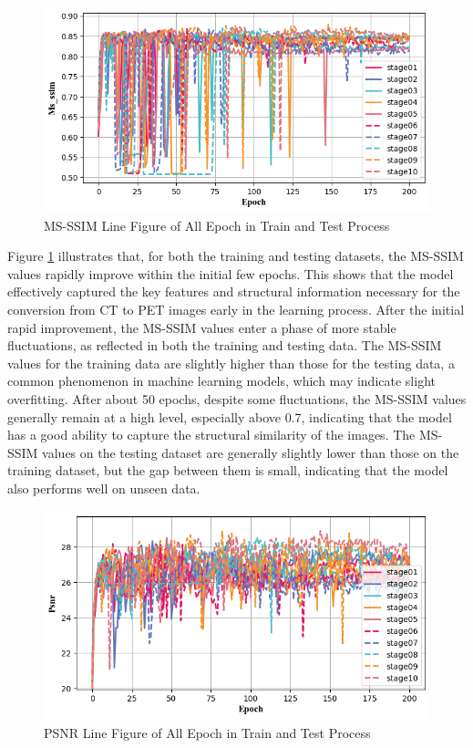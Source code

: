 \documentclass[twocolumn]{article}
\begin{document}
\begin{figure}[h]
	\centering
	\includegraphics[width=1.0\linewidth]{u-net/lung/csv_img_in_1_img_8_4/ms_ssim_comparison}
	\caption[msssim]{MS-SSIM Line Figure of All Epoch in Train and Test Process}
	\label{fig:msssim}
\end{figure}

Figure \ref{fig:msssim} illustrates that, for both the training and testing datasets, the MS-SSIM values rapidly improve within the initial few epochs. This shows that the model effectively captured the key features and structural information necessary for the conversion from CT to PET images early in the learning process. After the initial rapid improvement, the MS-SSIM values enter a phase of more stable fluctuations, as reflected in both the training and testing data. The MS-SSIM values for the training data are slightly higher than those for the testing data, a common phenomenon in machine learning models, which may indicate slight overfitting. After about 50 epochs, despite some fluctuations, the MS-SSIM values generally remain at a high level, especially above 0.7, indicating that the model has a good ability to capture the structural similarity of the images. The MS-SSIM values on the testing dataset are generally slightly lower than those on the training dataset, but the gap between them is small, indicating that the model also performs well on unseen data.

\begin{figure}[h]
	\centering
	\includegraphics[width=1.0\linewidth]{u-net/lung/csv_img_in_1_img_8_4/psnr_comparison}
	\caption[psnr]{PSNR Line Figure of All Epoch in Train and Test Process}
	\label{fig:psnr}
\end{figure}
\end{document}
